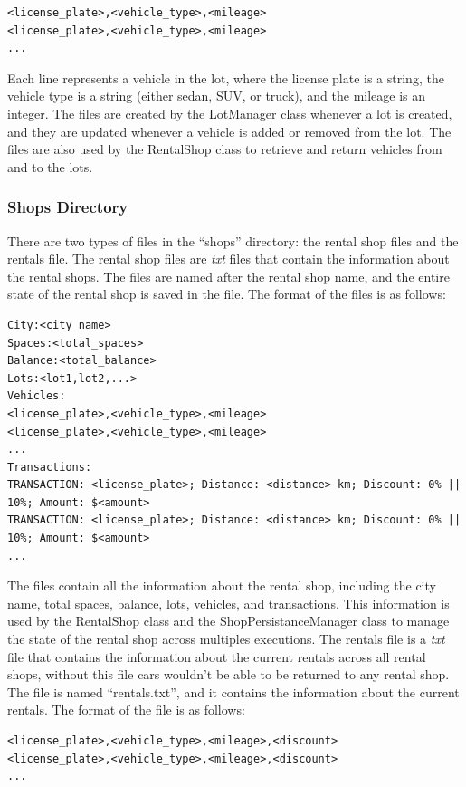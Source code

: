\documentclass[conference]{IEEEtran}
\begin{document}
\begin{lstlisting}[style=input]
<license_plate>,<vehicle_type>,<mileage>
<license_plate>,<vehicle_type>,<mileage>
...
\end{lstlisting}

Each line represents a vehicle in the lot, where the license plate is a string, the vehicle type is a string (either sedan, SUV, or truck), and the mileage is an integer. The files are created by the LotManager class whenever a lot is created, and they are updated whenever a vehicle is added or removed from the lot. The files are also used by the RentalShop class to retrieve and return vehicles from and to the lots.

\subsubsection{Shops Directory}
There are two types of files in the ``shops'' directory: the rental shop files and the rentals file. The rental shop files are \textit{txt} files that contain the information about the rental shops. The files are named after the rental shop name, and the entire state of the rental shop is saved in the file. The format of the files is as follows:

\begin{lstlisting}[style=input]
City:<city_name>
Spaces:<total_spaces>
Balance:<total_balance>
Lots:<lot1,lot2,...>
Vehicles:
<license_plate>,<vehicle_type>,<mileage>
<license_plate>,<vehicle_type>,<mileage>
... 
Transactions:
TRANSACTION: <license_plate>; Distance: <distance> km; Discount: 0% || 10%; Amount: $<amount>
TRANSACTION: <license_plate>; Distance: <distance> km; Discount: 0% || 10%; Amount: $<amount>
...
\end{lstlisting}

The files contain all the information about the rental shop, including the city name, total spaces, balance, lots, vehicles, and transactions. This information is used by the RentalShop class and the ShopPersistanceManager class to manage the state of the rental shop across multiples executions. The rentals file is a \textit{txt} file that contains the information about the current rentals across all rental shops, without this file cars wouldn't be able to be returned to any rental shop. The file is named ``rentals.txt'', and it contains the information about the current rentals. The format of the file is as follows:

\begin{lstlisting}[style=input]
<license_plate>,<vehicle_type>,<mileage>,<discount> 
<license_plate>,<vehicle_type>,<mileage>,<discount>
... 
\end{lstlisting}
\end{document}
